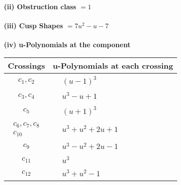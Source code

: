 \documentclass[1p]{elsarticle_modified}
\theoremstyle{definition}
\begin{document}
\flushleft \textbf{(ii) Obstruction class $= 1$}\\~\\
\flushleft \textbf{(iii) Cusp Shapes $= 7 u^2- u-7$}\\~\\
\newpage\renewcommand{\arraystretch}{1}
\flushleft \textbf{(iv) u-Polynomials at the component}\newline \\
\begin{tabular}{m{50pt}|m{274pt}}
Crossings & \hspace{64pt}u-Polynomials at each crossing \\
\hline $$\begin{aligned}c_{1},c_{2}\end{aligned}$$&$\begin{aligned}
&(u-1)^3
\end{aligned}$\\
\hline $$\begin{aligned}c_{3},c_{4}\end{aligned}$$&$\begin{aligned}
&u^3- u+1
\end{aligned}$\\
\hline $$\begin{aligned}c_{5}\end{aligned}$$&$\begin{aligned}
&(u+1)^3
\end{aligned}$\\
\hline $$\begin{aligned}c_{6},c_{7},c_{8}\\c_{10}\end{aligned}$$&$\begin{aligned}
&u^3+u^2+2 u+1
\end{aligned}$\\
\hline $$\begin{aligned}c_{9}\end{aligned}$$&$\begin{aligned}
&u^3- u^2+2 u-1
\end{aligned}$\\
\hline $$\begin{aligned}c_{11}\end{aligned}$$&$\begin{aligned}
&u^3
\end{aligned}$\\
\hline $$\begin{aligned}c_{12}\end{aligned}$$&$\begin{aligned}
&u^3+u^2-1
\end{aligned}$\\
\hline
\end{tabular}\\~\\
\end{document}
